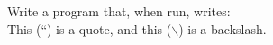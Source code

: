 \question[0]  Write a program that, when run, writes:\\ This (``) is a quote, and this ($\backslash$) is a backslash.

